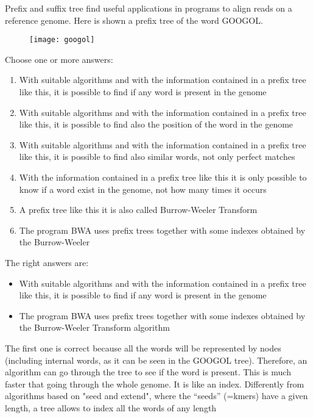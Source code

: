 \begin{Exercise} [
  label={ex34},
  origin={G. Valle}
 ]
Prefix and suffix tree find useful applications in programs to align reads on a
reference genome.  Here is shown a prefix tree of the word GOOGOL.

\begin{figure}[H]
  \centering
  \texttt{[image: googol]}
\end{figure}

\Question Choose one or more answers:
\begin{enumerate}
\item With suitable algorithms and with the information contained in a prefix
tree like this, it is possible to find if any word is present in the genome
\item With suitable algorithms and with the information contained in a prefix
tree like this, it is possible to find also the position of the word in the
genome
\item With suitable algorithms and with the information contained in a prefix
tree like this, it is possible to find also similar words, not only perfect
matches
\item With the information contained in a prefix tree like this it is only
possible to know if a word exist in the genome, not how many times it occurs
\item A prefix tree like this it is also called Burrow-Weeler Transform
\item The program BWA uses prefix trees together with some indexes obtained by
the Burrow-Weeler
\end{enumerate}

\end{Exercise}

\begin{Answer} [
  ref={ex34},
  number={1}
 ]

\Question The right answers are:
\begin{itemize}
\item With suitable algorithms and with the information contained in a prefix
tree like this, it is possible to find if any word is present in the genome
\item The program BWA uses prefix trees together with some indexes obtained by
the Burrow-Weeler Transform algorithm
\end{itemize}

The first one is correct because all the words will be represented by nodes 
(including internal words, as it can be seen in the GOOGOL tree). Therefore, an
algorithm can go through the tree to see if the word is present. This is much
faster that going through the whole genome. It is like an index.  Differently
from algorithms based on "seed and extend", where the ``seeds'' (=kmers) have a
given length, a tree allows to index all the words of any length

\end{Answer}

